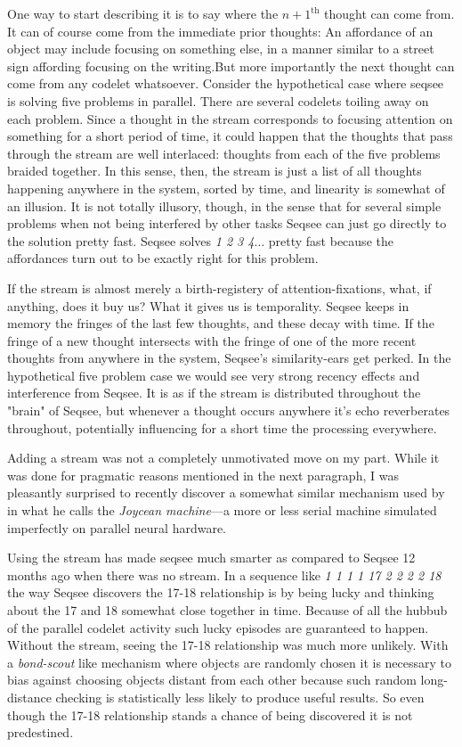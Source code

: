 \documentclass[letterpaper]{article}
\begin{document}
One way to start describing it is to say where the $n+1^{\mathrm{th}}$ thought can come from.  It can of course come  from the immediate prior thoughts: An affordance of an object may include focusing on something else, in a manner similar to a street sign affording focusing on the writing.But more importantly the next thought can come from any codelet whatsoever.  Consider the hypothetical case where seqsee is solving five problems in parallel.  There are several codelets toiling away on each problem.  Since a thought in the stream corresponds to focusing attention on something for a short period of time, it could happen that the thoughts that pass through the stream are well interlaced: thoughts from each of the five problems braided together. In this sense, then, the stream is just a list of all thoughts happening anywhere in the system, sorted by time, and linearity is somewhat of an illusion. It is not totally illusory, though, in the sense that for several simple problems when not being interfered by other tasks Seqsee can just go directly to the solution pretty fast. Seqsee solves \emph{1 2 3 4$\ldots$} pretty fast because the affordances turn out to be exactly right for this problem.

If the stream is almost merely a birth-registery of attention-fixations, what, if anything, does it buy us? What it gives us is temporality.  Seqsee keeps in memory the fringes of the last few thoughts, and these decay with time.  If the fringe of a new thought intersects with the fringe of one of the more recent thoughts from anywhere in the system, Seqsee's similarity-ears get perked.  In the hypothetical five problem case we would see very strong recency effects and interference from Seqsee.  It is as if the stream is distributed throughout the "brain" of Seqsee, but whenever a thought occurs anywhere it's echo reverberates throughout, potentially influencing for a short time the processing everywhere.

 Adding a stream was not a completely unmotivated move on my part. While it was done for pragmatic reasons mentioned in the next paragraph, I was pleasantly surprised to recently discover a somewhat similar mechanism used by  in what he calls the \emph{Joycean machine}---a more or less serial machine simulated imperfectly on parallel neural hardware.

Using the stream has made seqsee much smarter as compared to Seqsee 12 months ago when there was no stream.  In a sequence like \emph{1 1 1 1 17 2 2 2 2 18} the way Seqsee discovers the 17-18 relationship is by being lucky and thinking about the 17 and 18 somewhat close together in time.  Because of all the hubbub of the parallel codelet activity such lucky episodes are guaranteed to happen.  Without the stream, seeing the 17-18 relationship was much more unlikely.  With a \emph{bond-scout} like mechanism where objects are randomly chosen it is necessary to bias against choosing objects distant from each other because such random long-distance checking is statistically less likely to produce useful results.  So even though the 17-18 relationship stands a chance of being discovered it is not predestined.
\end{document}
